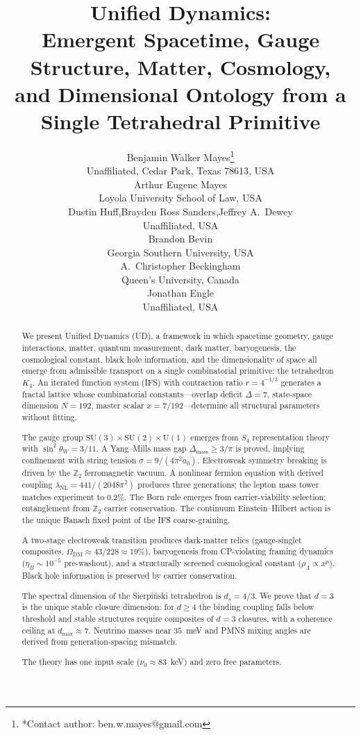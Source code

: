 \documentclass[11pt,twocolumn]{article}
\title{Unified Dynamics:\\Emergent Spacetime, Gauge Structure, Matter, Cosmology,\\and Dimensional Ontology from a Single Tetrahedral Primitive}
\author{%
Benjamin Walker Mayes\thanks{*Contact author: ben.w.mayes@gmail.com}\\[4pt]
{\small Unaffiliated, Cedar Park, Texas 78613, USA}\\[8pt]
Arthur Eugene Mayes\\
{\small Loyola University School of Law, USA}\\[4pt]
Dustin Huff,\quad Brayden Ross Sanders,\quad Jeffrey A.\ Dewey\\
{\small Unaffiliated, USA}\\[4pt]
Brandon Bevin\\
{\small Georgia Southern University, USA}\\[4pt]
A.\ Christopher Beckingham\\
{\small Queen's University, Canada}\\[4pt]
Jonathan Engle\\
{\small Unaffiliated, USA}%
}
\date{}
\begin{document}
\maketitle

\begin{abstract}
We present Unified Dynamics (UD), a framework in which spacetime geometry, gauge interactions, matter, quantum measurement, dark matter, baryogenesis, the cosmological constant, black hole information, and the dimensionality of space all emerge from admissible transport on a single combinatorial primitive: the tetrahedron~$K_4$.
An iterated function system (IFS) with contraction ratio $r=4^{-1/3}$ generates a fractal lattice whose combinatorial constants---overlap deficit $\Delta=7$, state-space dimension $N=192$, master scalar $x=7/192$---determine all structural parameters without fitting.

The gauge group $\mathrm{SU}(3)\times\mathrm{SU}(2)\times\mathrm{U}(1)$ emerges from $S_4$ representation theory with $\sin^2\theta_W=3/11$.
A Yang--Mills mass gap $\Delta_{\mathrm{mass}}\geq 3/\pi$ is proved, implying confinement with string tension $\sigma=9/(4\pi^2 a_0)$.
Electroweak symmetry breaking is driven by the $\mathbb{Z}_2$ ferromagnetic vacuum.
A nonlinear fermion equation with derived coupling $\lambda_{\mathrm{NL}}=441/(2048\pi^2)$ produces three generations; the lepton mass tower matches experiment to $0.2\%$.
The Born rule emerges from carrier-viability selection; entanglement from $\mathbb{Z}_2$ carrier conservation.
The continuum Einstein--Hilbert action is the unique Banach fixed point of the IFS coarse-graining.

A two-stage electroweak transition produces dark-matter relics (gauge-singlet composites, $\Omega_{\mathrm{DM}}\approx 43/228\approx 19\%$), baryogenesis from CP-violating framing dynamics ($\eta_B\sim 10^{-5}$ pre-washout), and a structurally screened cosmological constant ($\rho_\Lambda\propto x^{p}$).
Black hole information is preserved by carrier conservation.

The spectral dimension of the Sierpi\'nski tetrahedron is $d_s=4/3$.
We prove that $d=3$ is the unique stable closure dimension: for $d\geq 4$ the binding coupling falls below threshold and stable structures require composites of $d=3$ closures, with a coherence ceiling at $d_{\max}\approx 7$.
Neutrino masses near $35$~meV and PMNS mixing angles are derived from generation-spacing mismatch.

The theory has one input scale ($\nu_0\approx 83$~keV) and zero free parameters.
\end{abstract}
\end{document}
